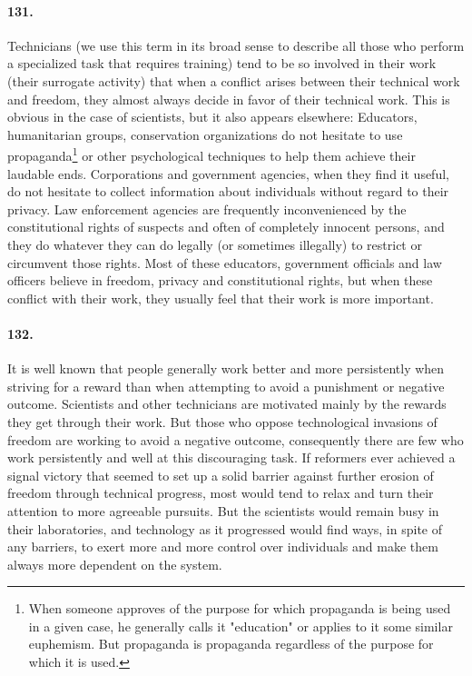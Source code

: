 \documentclass[12pt]{book}
\begin{document}
\paragraph{131.}  Technicians (we use this term in its broad sense to describe all those who perform a specialized task that requires training) tend to be so involved in their work (their surrogate activity) that when a conflict arises between their technical work and freedom, they almost always decide in favor of their technical work. This is obvious in the case of scientists, but it also appears elsewhere: Educators, humanitarian groups, conservation organizations do not hesitate to use propaganda\footnote{When someone approves of the purpose for which propaganda is being used in a given case, he generally calls it "education" or applies to it some similar euphemism. But propaganda is propaganda regardless of the purpose for which it is used.} or other psychological techniques to help them achieve their laudable ends. Corporations and government agencies, when they find it useful, do not hesitate to collect information about individuals without regard to their privacy. Law enforcement agencies are frequently inconvenienced by the constitutional rights of suspects and often of completely innocent persons, and they do whatever they can do legally (or sometimes illegally) to restrict or circumvent those rights. Most of these educators, government officials and law officers believe in freedom, privacy and constitutional rights, but when these conflict with their work, they usually feel that their work is more important.


\paragraph{132.} It is well known that people generally work better and more persistently when striving for a reward than when attempting to avoid a punishment or negative outcome. Scientists and other technicians are motivated mainly by the rewards they get through their work. But those who oppose technological invasions of freedom are working to avoid a negative outcome, consequently there are few who work persistently and well at this discouraging task. If reformers ever achieved a signal victory that seemed to set up a solid barrier against further erosion of freedom through technical progress, most would tend to relax and turn their attention to more agreeable pursuits. But the scientists would remain busy in their laboratories, and technology as it progressed would find ways, in spite of any barriers, to exert more and more control over individuals and make them always more dependent on the system.
\end{document}
